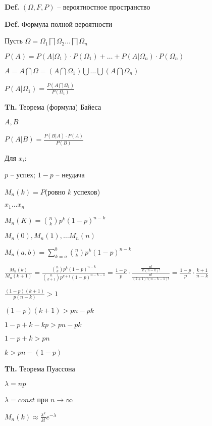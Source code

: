 \documentclass[14pt, letter paper]{article}
\begin{document}
\textbf{Def.} $(\Omega, F, P)$ -- вероятностное пространство

\vspace{5mm}

\textbf{Def.} Формула полной вероятности

Пусть $\Omega = \Omega_1 \bigsqcap \Omega_2 \ldots \bigsqcap \Omega_n$

$P(A) = P(A | \Omega_1) \cdot P(\Omega_1) + \ldots + P(A | \Omega_n) \cdot P(\Omega_n)$

$A = A \bigcap \Omega = (A \bigcap \Omega_1) \bigcup \ldots \bigcup (A \bigcap \Omega_n)$

$P(A | \Omega_1) = \frac{P(A \bigcap \Omega_1)}{P(\Omega_1)}$

\vspace{5mm}

\textbf{Th.} Теорема (формула) Байеса 

$A, B$

$P(A | B) = \frac{P(B|A) \cdot P(A)}{P(B)}$

\vspace{5mm}

Для $x_i$:

$p$ -- успех; $1 - p$ -- неудача

$M_n(k) = P$(ровно $k$ успехов)

$x_1 \ldots x_n$

$M_n(K) = {n \choose k} p^k (1-p)^{n-k}$

$M_n(0), M_n(1), \ldots M_n(n)$

$M_n(a, b) = \sum\limits_{k=a}^b {n \choose k} p^k (1-p)^{n-k}$

$\frac{M_n(k)}{M_n(k+1)} = \frac{{n \choose k} p^k (1-p)^{n-k}}{{n \choose k + 1} p^{k+1} (1-p)^{n-k-1}} = \frac{1-p}{p} \cdot \frac{\frac{n!}{k!(n-k)!}}{\frac{n!}{(k+1)!(n-k-1)!}} = \frac{1-p}{p} \cdot \frac{k+1}{n-k}$

$\frac{(1-p)(k+1)}{p(n-k)} > 1$

$(1-p)(k+1) > pn - pk$

$1 - p + k - kp > pn - pk$

$1 - p + k > pn$

$k > pn - (1-p)$

\vspace{5mm}

\textbf{Th.} Теорема Пуассона

$\lambda = np$

$\lambda = const$ при $n \rightarrow \infty$

$M_n(k) \approx \frac{\lambda^k}{k!} e^{-\lambda}$
\end{document}

